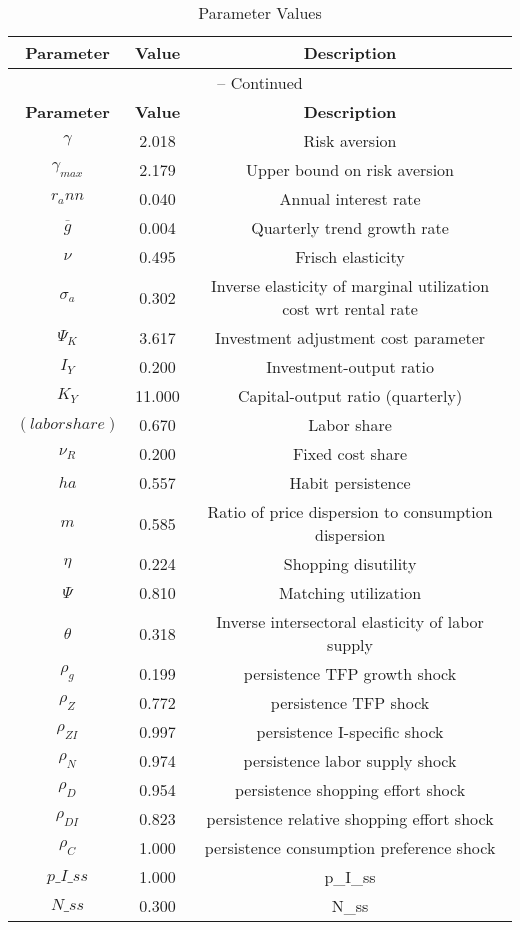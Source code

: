 \begin{center}
\begin{longtable}{ccc}
\caption{Parameter Values}\\%
\toprule%
\multicolumn{1}{c}{\textbf{Parameter}} &
\multicolumn{1}{c}{\textbf{Value}} &
 \multicolumn{1}{c}{\textbf{Description}}\\%
\midrule%
\endfirsthead
\multicolumn{3}{c}{{\tablename} \thetable{} -- Continued}\\%
\midrule%
\multicolumn{1}{c}{\textbf{Parameter}} &
\multicolumn{1}{c}{\textbf{Value}} &
  \multicolumn{1}{c}{\textbf{Description}}\\%
\midrule%
\endhead
${\gamma}$ 	 & 	 2.018 	 & 	 Risk aversion\\
${\gamma_{max}}$ 	 & 	 2.179 	 & 	 Upper bound on risk aversion\\
${r_ann}$ 	 & 	 0.040 	 & 	 Annual interest rate\\
${\overline{g}}$ 	 & 	 0.004 	 & 	 Quarterly trend growth rate\\
$\nu$ 	 & 	 0.495 	 & 	 Frisch elasticity\\
${\sigma_a}$ 	 & 	 0.302 	 & 	 Inverse elasticity of marginal utilization cost wrt rental rate\\
${\Psi_K}$ 	 & 	 3.617 	 & 	 Investment adjustment cost parameter\\
${I_Y}$ 	 & 	 0.200 	 & 	 Investment-output ratio\\
${K_Y}$ 	 & 	 11.000 	 & 	 Capital-output ratio (quarterly)\\
$(labor share)$ 	 & 	 0.670 	 & 	 Labor share\\
${\nu_R}$ 	 & 	 0.200 	 & 	 Fixed cost share\\
${ha}$ 	 & 	 0.557 	 & 	 Habit persistence\\
${m}$ 	 & 	 0.585 	 & 	 Ratio of price dispersion to consumption dispersion\\
${\eta}$ 	 & 	 0.224 	 & 	 Shopping disutility\\
${\Psi}$ 	 & 	 0.810 	 & 	 Matching utilization\\
${\theta}$ 	 & 	 0.318 	 & 	 Inverse intersectoral elasticity of labor supply\\
${\rho_g}$ 	 & 	 0.199 	 & 	 persistence TFP growth shock\\
${\rho_Z}$ 	 & 	 0.772 	 & 	 persistence TFP shock\\
${\rho_{ZI}}$ 	 & 	 0.997 	 & 	 persistence I-specific shock\\
${\rho_N}$ 	 & 	 0.974 	 & 	 persistence labor supply shock\\
${\rho_D}$ 	 & 	 0.954 	 & 	 persistence shopping effort shock\\
${\rho_{DI}}$ 	 & 	 0.823 	 & 	 persistence relative shopping effort shock\\
${\rho_C}$ 	 & 	 1.000 	 & 	 persistence consumption preference shock\\
$p\_I\_ss$ 	 & 	 1.000 	 & 	 p\_I\_ss\\
$N\_ss$ 	 & 	 0.300 	 & 	 N\_ss\\
\bottomrule%
\end{longtable}
\end{center}
